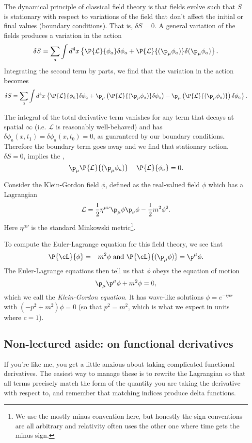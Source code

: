 The dynamical principle of classical field theory is that fields evolve such that $S$ is stationary with respect to variations of the field that don't affect the initial or final values (boundary conditions). That is, $\delta S=0$. A general variation of the fields produces a variation in the action
$$\delta S=\sum_a \int d^4 x\left \{ \P{\mathcal{L}}{\phi_a}\delta\phi_a +\P{\mathcal{L}}{(\p_\mu\phi_a)} \delta(\p_\mu \phi_a)\right\}.$$
Integrating the second term by parts, we find that the variation in the action becomes
$$\delta S= \sum_a \int d^4x \left\{ \P{\mathcal{L}}{\phi_a}\delta \phi_a +\p_\mu \left( \P{\mathcal{L}}{(\p_\mu \phi_a)}\delta \phi_a\right)-\p_\mu \left(\P{\mathcal{L}}{(\p_\mu \phi_a)}\right)\delta \phi_a\right\}.$$

The integral of the total derivative term vanishes for any term that decays at spatial $\infty$ (i.e. $\mathcal{L}$ is reasonably well-behaved) and has $\delta \phi_a(x,t_1)=\delta \phi_a(x,t_0)=0$, as guaranteed by our boundary conditions. Therefore the boundary term goes away and we find that stationary action, $\delta S=0$, implies the ,
\begin{equation}
\p_\mu\P{\mathcal{L}}{(\p_\mu\phi_a)}-\P{\mathcal{L}}{\phi_a}=0.
\end{equation}

\begin{exm}
Consider the Klein-Gordon field $\phi$, defined as the real-valued field $\phi$ which has a Lagrangian
\begin{equation}
\mathcal{L}=\frac{1}{2} \eta^{\mu\nu}\p_\mu \phi \p_\nu \phi -\frac{1}{2}m^2 \phi^2.
\end{equation}
Here $\eta^{\mu\nu}$ is the standard Minkowski metric\footnote{We use the mostly minus convention here, but honestly the sign conventions are all arbitrary and relativity often uses the other one where time gets the minus sign.}.

To compute the Euler-Lagrange equation for this field theory,
 we see that $$\P{\cL}{\phi}=-m^2\phi \text{ and } \P{\cL}{(\p_\mu \phi)}=\p^\mu \phi.$$
The Euler-Lagrange equations then tell us that $\phi$ obeys the equation of motion $$\p_\mu \p^\mu \phi+m^2\phi = 0,$$ which we call the \emph{Klein-Gordon equation}. It has wave-like solutions $\phi=e^{-ipx}$ with $(-p^2+m^2)\phi=0$ (so that $p^2=m^2$, which is what we expect in units where $c=1$).
\end{exm}

\subsection*{Non-lectured aside: on functional derivatives} If you're like me, you get a little anxious about taking complicated functional derivatives. The easiest way to manage these is to rewrite the Lagrangian so that all terms precisely match the form of the quantity you are taking the derivative with respect to, and remember that matching indices produce delta functions. 

